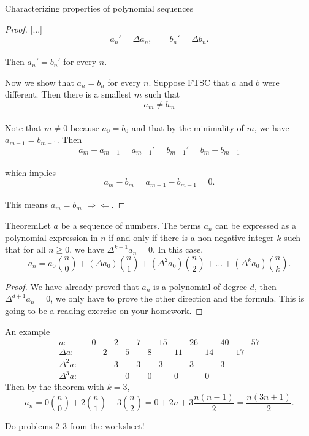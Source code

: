 \documentclass{beamer}
\def\bl[#1]#2{\begin{block}{#1}#2\end{block}}
\begin{document}
\begin{frame}{Characterizing properties of polynomial sequences}
\begin{proof}

[...]\vspace{-0.2cm}
\[
a_n'=\Delta a_n,\qquad b_n'=\Delta b_n.
\]\\\vspace{-0.2cm}
Then $a_n'=b_n'$ for every $n$.\vspace{0.2cm}

Now we show that $a_n=b_n$ for every $n$. Suppose FTSC that $a$ and $b$ were different. Then there is a smallest $m$ such that\vspace{-0.2cm}
\[
a_m\neq b_m
\]\\\vspace{-0.2cm}
Note that $m\neq 0$ because $a_0=b_0$ and that by the minimality of $m$, we have $a_{m-1}=b_{m-1}$. Then\vspace{-0.2cm}
\[
a_m-a_{m-1}=a_{m-1}'=b_{m-1}'=b_m-b_{m-1}
\]\\\vspace{-0.3cm}
which implies\vspace{-0.2cm}
\[
a_m-b_m=a_{m-1}-b_{m-1}=0.
\]\\\vspace{-0.2cm}
This means $a_m=b_m$ $\Rightarrow\Leftarrow$.
\end{proof}
\end{frame}


\begin{frame}
\bl[Theorem]{Let $a$ be a sequence of numbers. The terms $a_n$ can be expressed as a polynomial expression in $n$ if and only if there is a non-negative integer $k$ such that for all $n\geq 0$, we have $\Delta^{k+1}a_n=0$. In this case,
\[
a_n=a_0\binom{n}{0}+(\Delta a_0)\binom{n}{1}+(\Delta^2a_0)\binom{n}{2}+\dots+(\Delta^ka_0)\binom{n}{k}.
\]}
\begin{proof}
We have already proved that $a_n$ is a polynomial of degree $d$, then $\Delta^{d+1}a_n=0$, we only have to prove the other direction and the formula. This is going to be a reading exercise on your homework.
\end{proof}
\end{frame}

\begin{frame}{An example}
\[
\begin{array}{rcccccccccccccc}
a:&&0&&2&&7&&15&&26&&40&&57\\
\Delta a:&&&2&&5&&8&&11&&14&&17&\\
\Delta^2 a:&&&&3&&3&&3&&3&&3&&\\
\Delta^3 a:&&&&&0&&0&&0&&0&&&
\end{array}
\]
Then by the theorem with $k=3$,
\[
a_n=0\binom{n}{0}+2\binom{n}{1}+3\binom{n}{2}=0+2n+3\frac{n(n-1)}{2}=\frac{n(3n+1)}{2}.
\]

\center Do problems 2-3 from the worksheet!
\end{frame}
\end{document}
